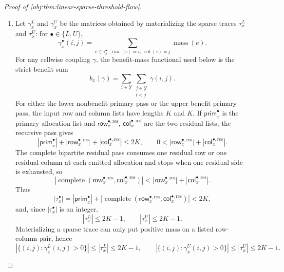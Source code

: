 \begin{proof}[Proof of \cref{obj:thm:linear-sparse-threshold-flow}]
\begin{enumerate}
\item Let \(\gamma_x^L\) and \(\gamma_x^U\) be the matrices obtained by materializing the sparse traces \(\tau_x^L\) and \(\tau_x^U\): for \(\bullet\in\{L,U\}\),
\[
\gamma_x^\bullet(i,j)
=
\sum_{e\in\tau_x^\bullet:\ \operatorname{row}(e)=i,\ \operatorname{col}(e)=j}
\operatorname{mass}(e).
\]
For any cellwise coupling \(\gamma\), the benefit-mass functional used below is the strict-benefit sum
\[
b_x(\gamma)
=
\sum_{i\in\mathcal Y}\sum_{\substack{j\in\mathcal Y\\ i<j}}\gamma(i,j).
\]
For either the lower nonbenefit primary pass or the upper benefit primary pass, the input row and column lists have lengths \(K\) and \(K\).  If \(\mathsf{prim}_x^\bullet\) is the primary allocation list and \(\mathsf{row}_{x}^{\bullet,\mathrm{res}}\), \(\mathsf{col}_{x}^{\bullet,\mathrm{res}}\) are the two residual lists, the recursive pass gives
\[
|\mathsf{prim}_x^\bullet|
+|\mathsf{row}_{x}^{\bullet,\mathrm{res}}|
+|\mathsf{col}_{x}^{\bullet,\mathrm{res}}|
\le 2K,
\qquad
0<|\mathsf{row}_{x}^{\bullet,\mathrm{res}}|
+|\mathsf{col}_{x}^{\bullet,\mathrm{res}}|.
\]
The complete bipartite residual pass consumes one residual row or one residual column at each emitted allocation and stops when one residual side is exhausted, so
\[
|\operatorname{complete}(\mathsf{row}_{x}^{\bullet,\mathrm{res}},
\mathsf{col}_{x}^{\bullet,\mathrm{res}})|
<
|\mathsf{row}_{x}^{\bullet,\mathrm{res}}|
+|\mathsf{col}_{x}^{\bullet,\mathrm{res}}|.
\]
Thus
\[
|\tau_x^\bullet|
=
|\mathsf{prim}_x^\bullet|
+|\operatorname{complete}(\mathsf{row}_{x}^{\bullet,\mathrm{res}},
\mathsf{col}_{x}^{\bullet,\mathrm{res}})|
<2K,
\]
and, since \(|\tau_x^\bullet|\) is an integer,
\[
|\tau_x^L|\le 2K-1,
\qquad
|\tau_x^U|\le 2K-1.
\]
Materializing a sparse trace can only put positive mass on a listed row-column pair, hence
\[
|\{(i,j):\gamma_x^L(i,j)>0\}|\le |\tau_x^L|\le 2K-1,
\qquad
|\{(i,j):\gamma_x^U(i,j)>0\}|\le |\tau_x^U|\le 2K-1 .
\]


\end{enumerate}
\end{proof}
